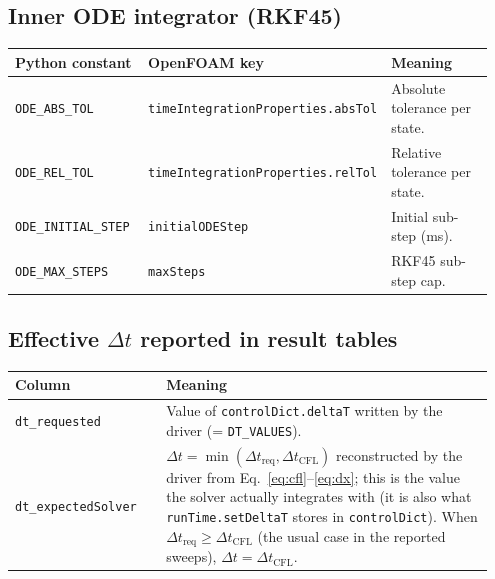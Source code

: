 \documentclass[11pt,a4paper]{article}
\newcommand{\code}[1]{\texttt{\small #1}}
\begin{document}
\subsection{Inner ODE integrator (RKF45)}
\begin{longtable}{@{}p{0.30\linewidth}p{0.30\linewidth}p{0.35\linewidth}@{}}
\toprule
Python constant & OpenFOAM key & Meaning \\
\midrule \endhead
\code{ODE\_ABS\_TOL} & \code{timeIntegrationProperties.absTol} &
   Absolute tolerance per state. \\
\code{ODE\_REL\_TOL} & \code{timeIntegrationProperties.relTol} &
   Relative tolerance per state. \\
\code{ODE\_INITIAL\_STEP} & \code{initialODEStep} &
   Initial sub-step (ms). \\
\code{ODE\_MAX\_STEPS} & \code{maxSteps} & RKF45 sub-step cap. \\
\bottomrule
\end{longtable}

\subsection{Effective $\Delta t$ reported in result tables}
\begin{longtable}{@{}p{0.30\linewidth}p{0.65\linewidth}@{}}
\toprule
Column & Meaning \\
\midrule \endhead
\code{dt\_requested} &
   Value of \code{controlDict.deltaT} written by the driver
   (= \code{DT\_VALUES}). \\
\code{dt\_expectedSolver} &
   $\Delta t = \min(\Delta t_{\text{req}}, \Delta t_{\text{CFL}})$
   reconstructed by the driver from
   Eq.~\eqref{eq:cfl}--\eqref{eq:dx}; this is the value the
   solver actually integrates with (it is also what
   \code{runTime.setDeltaT} stores in \code{controlDict}).
   When $\Delta t_{\text{req}} \ge \Delta t_{\text{CFL}}$
   (the usual case in the reported sweeps),
   $\Delta t = \Delta t_{\text{CFL}}$. \\
\bottomrule
\end{longtable}
\end{document}
